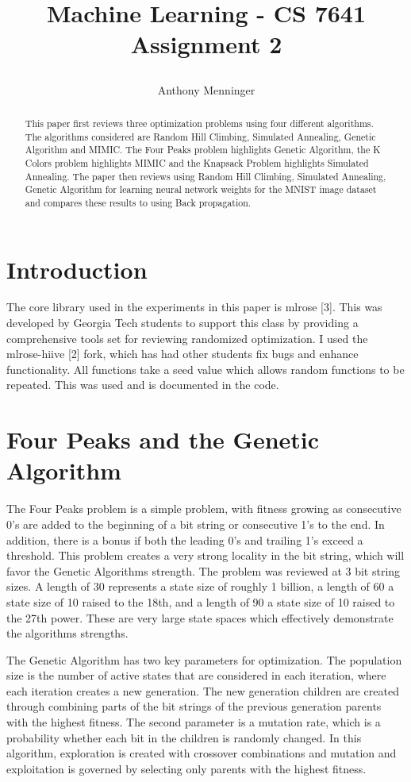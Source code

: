 \documentclass[letterpaper]{article} %
\title{
Machine Learning - CS 7641
Assignment 2
	
}
\author {
    Anthony Menninger \\
}
\begin{document}
\maketitle

\begin{abstract}
This paper first reviews three optimization problems using four different algorithms. The algorithms considered are Random Hill Climbing, Simulated Annealing, Genetic Algorithm and MIMIC.  The Four Peaks problem highlights Genetic Algorithm, the K Colors problem highlights MIMIC and the Knapsack Problem highlights Simulated Annealing.  The paper then reviews using Random Hill Climbing, Simulated Annealing, Genetic Algorithm for learning neural network weights for the MNIST image dataset and compares these results to using Back propagation.  
\end{abstract}

\section{Introduction}
The core library used in the experiments in this paper is mlrose [3].  This was developed by Georgia Tech students to support this class by providing a comprehensive tools set for reviewing randomized optimization.  I used the mlrose-hiive [2] fork, which has had other students fix bugs and enhance functionality.  All functions take a seed value which allows random functions to be repeated.  This was used and is documented in the code.

\section{Four Peaks and the Genetic Algorithm}
The Four Peaks problem is a simple problem, with fitness growing as consecutive 0's are added to the beginning of a bit string or consecutive 1's to the end.  In addition, there is a bonus if both the leading 0's and trailing 1's exceed a threshold.  This problem creates a very strong locality in the bit string, which will favor the Genetic Algorithms strength.  The problem was reviewed at 3 bit string sizes.   A length of 30 represents a state size of roughly 1 billion, a length of 60 a state size of 10 raised to the 18th, and a length of 90 a state size of 10 raised to the 27th power.  These are very large state spaces which effectively demonstrate the algorithms strengths. 

The Genetic Algorithm has two key parameters for optimization.  The population size is the number of active states that are considered in each iteration, where each iteration creates a new generation.  The new generation children are  created through combining parts of the bit strings of the previous generation parents with the highest fitness.  The second parameter is a mutation rate, which is a probability whether each bit in the children is randomly changed.  In this algorithm, exploration is created with crossover combinations and mutation and exploitation is governed by selecting only parents with the highest fitness.
\end{document}

